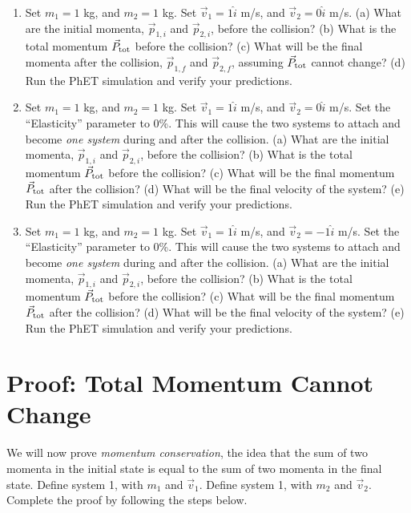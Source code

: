 \documentclass{article}
\begin{document}
\begin{enumerate}
\item Set $m_1 = 1$ kg, and $m_2 = 1$ kg.  Set $\vec{v}_1 = 1\hat{i}$ m/s, and $\vec{v}_2 = 0\hat{i}$ m/s.  (a) What are the initial momenta, $\vec{p}_{1,i}$ and $\vec{p}_{2,i}$, before the collision? (b) What is the total momentum $\vec{P}_{\rm tot}$ before the collision? (c) What will be the final momenta after the collision, $\vec{p}_{1,f}$ and $\vec{p}_{2,f}$, assuming $\vec{P}_{\rm tot}$ cannot change? (d) Run the PhET simulation and verify your predictions.  \\ \vspace{2cm}
\item Set $m_1 = 1$ kg, and $m_2 = 1$ kg.  Set $\vec{v}_1 = 1\hat{i}$ m/s, and $\vec{v}_2 = 0\hat{i}$ m/s.  Set the ``Elasticity'' parameter to 0\%.  This will cause the two systems to attach and become \textit{one system} during and after the collision.  (a) What are the initial momenta, $\vec{p}_{1,i}$ and $\vec{p}_{2,i}$, before the collision? (b) What is the total momentum $\vec{P}_{\rm tot}$ before the collision? (c) What will be the final momentum $\vec{P}_{\rm tot}$ after the collision? (d) What will be the final velocity of the system?  (e) Run the PhET simulation and verify your predictions.  \\ \vspace{2cm}
\item Set $m_1 = 1$ kg, and $m_2 = 1$ kg.  Set $\vec{v}_1 = 1\hat{i}$ m/s, and $\vec{v}_2 = -1\hat{i}$ m/s.  Set the ``Elasticity'' parameter to 0\%.  This will cause the two systems to attach and become \textit{one system} during and after the collision.  (a) What are the initial momenta, $\vec{p}_{1,i}$ and $\vec{p}_{2,i}$, before the collision? (b) What is the total momentum $\vec{P}_{\rm tot}$ before the collision? (c) What will be the final momentum $\vec{P}_{\rm tot}$ after the collision? (d) What will be the final velocity of the system?  (e) Run the PhET simulation and verify your predictions.  \\ \vspace{2cm}
\end{enumerate}

\section{Proof: Total Momentum Cannot Change}

We will now prove \textit{momentum conservation}, the idea that the sum of two momenta in the initial state is equal to the sum of two momenta in the final state.  Define system 1, with $m_1$ and $\vec{v}_1$.  Define system 1, with $m_2$ and $\vec{v}_2$.  Complete the proof by following the steps below.
\end{document}
